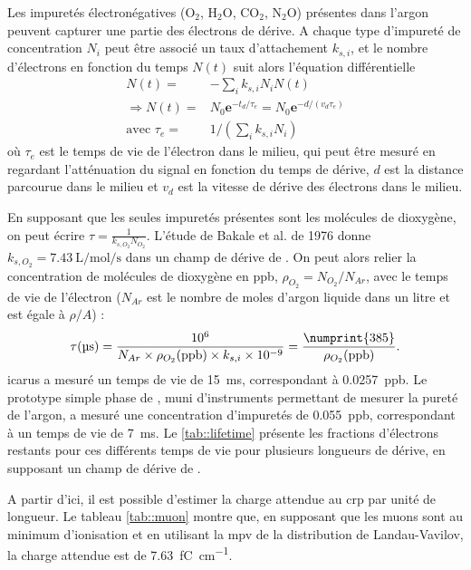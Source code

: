         Les impuretés électronégatives (O$_2$, H$_2$O, CO$_2$, N$_2$O) présentes dans l'argon peuvent capturer une partie des électrons de dérive. A chaque type d'impureté de concentration $N_i$ peut être associé un taux d'attachement $k_{s,i}$, et le nombre d'électrons en fonction du temps $N(t)$ suit alors l'équation différentielle\cite{Buckley1989}
        \begin{eqnarray}\label{eq::e_lifetime}
          N(t) = & -\sum_{i} k_{s,i}N_i N(t)\\
          \Rightarrow N(t) = & N_0\textbf{e}^{-t_d/\tau_e}=N_0\textbf{e}^{-d/(v_d\tau_e)}\label{eq::losses} \\
          \text{avec } \tau_e = & 1/(\sum_{i} k_{s,i}N_i)
        \end{eqnarray}
        où $\tau_e$ est le temps de vie de l'électron dans le milieu, qui peut être mesuré en regardant l'atténuation du signal en fonction du temps de dérive, $d$ est la distance parcourue dans le milieu et $v_d$ est la vitesse de dérive des électrons dans le milieu.

        En supposant que les seules impuretés présentes sont les molécules de dioxygène, on peut écrire $\tau = \frac{1}{k_{s,O_2} N_{O_2}}$. L'étude de Bakale et al. de 1976\cite{Bakale1976} donne $k_{s,O_2}=\SI{7.43}{\liter\per\mole\per\second}$ dans un champ de dérive de \driftfield{}. On peut alors relier la concentration de molécules de dioxygène en ppb, $\rho_{O_2}=N_{O_2}/N_{Ar}$, avec le temps de vie de l'électron ($N_{Ar}$ est le nombre de moles d'argon liquide dans un litre et est égale à $\rho/A$) : 
        \begin{equation}\label{eq::purity}
          \tau(\si{\micro\second}) = \frac{10^6}{N_{Ar}\times \rho_{O_2}(\si{ppb}) \times k_{s,i} \times 10^{-9}} = \frac{\numprint{385}}{\rho_{O_2}(\si{ppb})}.
        \end{equation}
        \gls{icarus} a mesuré un temps de vie de \SI{15}{\milli\second}\cite{Antonello2014}, correspondant à \SI{0.0257}{ppb}. Le prototype simple phase de \protosp{}, muni d'instruments permettant de mesurer la pureté de l'argon, a mesuré une concentration d'impuretés de \SI{0.055}{ppb}, correspondant à un temps de vie de \SI{7}{\milli\second}. Le \autoref{tab::lifetime} présente les fractions d'électrons restants pour ces différents temps de vie pour plusieurs longueurs de dérive, en supposant un champ de dérive de \driftfield{}.

        A partir d'ici, il est possible d'estimer la charge attendue au \gls{crp} par unité de longueur. Le tableau \autoref{tab::muon} montre que, en supposant que les muons sont au minimum d'ionisation et en utilisant la \gls{mpv} de la distribution de Landau-Vavilov, la charge attendue est de \SI{7.63}{\femto\coulomb\per\centi\meter}.

